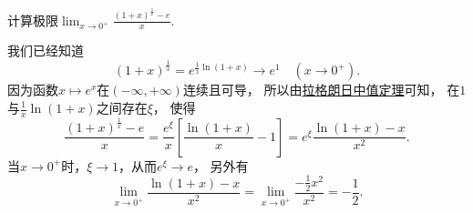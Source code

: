 \begin{example}
计算极限\(\lim_{x\to0^+} \frac{(1+x)^{\frac1x} - e}{x}\).
\begin{solution}
我们已经知道\begin{equation*}
	(1+x)^{\frac1x}
	= e^{\frac1x \ln(1+x)}
	\to e^1
	\quad(x\to0^+).
\end{equation*}
因为函数\(x \mapsto e^x\)在\((-\infty,+\infty)\)连续且可导，
所以由\hyperref[theorem:微分中值定理.拉格朗日中值定理]{拉格朗日中值定理}可知，
在\(1\)与\(\frac1x \ln(1+x)\)之间存在\(\xi\)，
使得\begin{equation*}
	\frac{(1+x)^{\frac1x} - e}{x}
	= \frac{e^\xi}{x} \left[ \frac{\ln(1+x)}{x} - 1 \right]
	= e^\xi \frac{\ln(1+x) - x}{x^2}.
\end{equation*}
当\(x\to0^+\)时，\(\xi\to1\)，从而\(e^\xi \to e\)，
另外有\begin{equation*}
	\lim_{x\to0^+} \frac{\ln(1+x) - x}{x^2}
	= \lim_{x\to0^+} \frac{-\frac12 x^2}{x^2}
	= -\frac12.
\end{equation*}
\end{solution}
\end{example}

